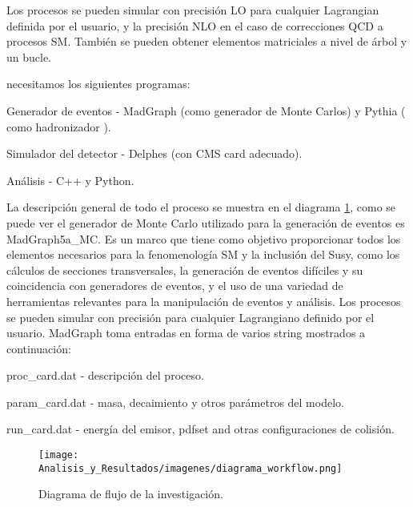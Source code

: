  Los procesos se pueden simular con precisión LO para cualquier Lagrangian definida por el usuario, y la precisión NLO en el caso de correcciones QCD a procesos SM. También se pueden obtener elementos matriciales a nivel de árbol y un bucle.

necesitamos los siguientes programas:
\begin{itemize_f}
	\item  Generador de eventos - MadGraph (como generador de Monte Carlos) y Pythia ( como hadronizador ).
	\item  Simulador del detector - Delphes (con CMS card adecuado).
	\item  Análisis - C++ y Python.
\end{itemize_f}

La descripción general de todo el proceso se muestra en el diagrama \ref{fig:diagrama_workflow}, como se puede ver el generador de Monte Carlo utilizado para la generación de eventos es MadGraph5a\_MC. Es un marco que tiene como objetivo proporcionar todos los elementos necesarios para la fenomenología SM y la inclusión del Susy, como los cálculos de secciones transversales, la generación de eventos difíciles y su coincidencia con generadores de eventos, y el uso de una variedad de herramientas relevantes para la manipulación de eventos y análisis. Los procesos se pueden simular con precisión para cualquier Lagrangiano definido por el usuario. MadGraph toma entradas en forma de varios string mostrados a continuación:
\begin{itemize_f}
	\item  proc\_card.dat - descripción del proceso.
	\item  param\_card.dat - masa, decaimiento y otros parámetros del modelo.
	\item  run\_card.dat - energía del emisor, pdfset and otras configuraciones de colisión.
\end{itemize_f}

\begin{figure}[h!]
    \centering
    \texttt{[image: Analisis\_y\_Resultados/imagenes/diagrama\_workflow.png]}
    \caption{Diagrama de flujo de la investigación.}
    \label{fig:diagrama_workflow}
\end{figure}

